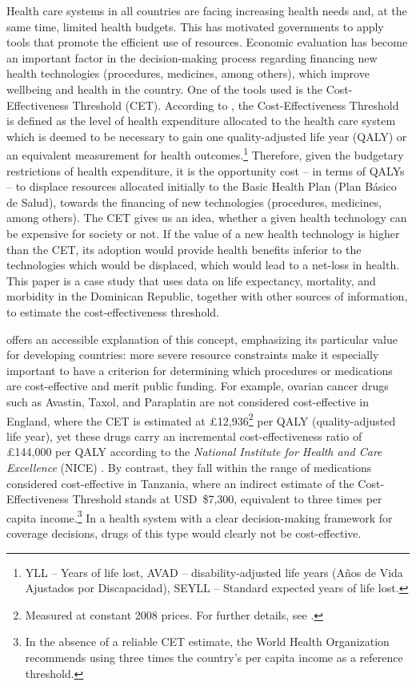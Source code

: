 \documentclass[11pt]{article}
\numberwithin{equation}{section}
\theoremstyle{remark}
\begin{document}
Health care systems in all countries are facing increasing health needs and, at the same time, limited health budgets. This has motivated governments to apply tools that promote the efficient use of resources. Economic evaluation has become an important factor in the decision-making process regarding financing new health technologies (procedures, medicines, among others), which improve wellbeing and health in the country. One of the tools used is the Cost-Effectiveness Threshold (CET). 
      According to \citet{Claxton2015}, the Cost-Effectiveness Threshold is defined as the level of health expenditure allocated to the health care system which is deemed to be necessary to gain one quality-adjusted life year (QALY) or an equivalent measurement for health outcomes.\footnote{YLL -- Years of life lost, AVAD -- disability-adjusted life years (Años de Vida Ajustados por Discapacidad), SEYLL -- Standard expected years of life lost.}  Therefore, given the budgetary restrictions of health expenditure, it is the opportunity cost – in terms of QALYs – to displace resources allocated initially to the Basic Health Plan (Plan Básico de Salud), towards the financing of new technologies (procedures, medicines, among others). The CET gives us an idea, whether a given health technology can be expensive for society or not. If the value of a new health technology is higher than the CET, its adoption would provide health benefits inferior to the technologies which would be displaced, which would lead to a net-loss in health. 
     This paper is a case study that uses data on life expectancy, mortality, and morbidity in the Dominican Republic, together with other sources of information, to estimate the cost-effectiveness threshold.


\citet{Culyer2016} offers an accessible explanation of this concept, emphasizing its particular value for developing countries: more severe resource constraints make it especially important to have a criterion for determining which procedures or medications are cost-effective and merit public funding. For example, ovarian cancer drugs such as Avastin, Taxol, and Paraplatin are not considered cost-effective in England, where the CET is estimated at \pounds12,936\footnote{Measured at constant 2008 prices. For further details, see \citet{Claxton2015}.} per QALY (quality-adjusted life year), yet these drugs carry an incremental cost-effectiveness ratio of \pounds144,000 per QALY according to the \textit{National Institute for Health and Care Excellence} (NICE) \parencite{Culyer2016}. By contrast, they fall within the range of medications considered cost-effective in Tanzania, where an indirect estimate of the Cost-Effectiveness Threshold stands at USD~\$7,300, equivalent to three times per capita income.\footnote{In the absence of a reliable CET estimate, the World Health Organization recommends using three times the country's per capita income as a reference threshold.} In a health system with a clear decision-making framework for coverage decisions, drugs of this type would clearly not be cost-effective. \\
\end{document}
